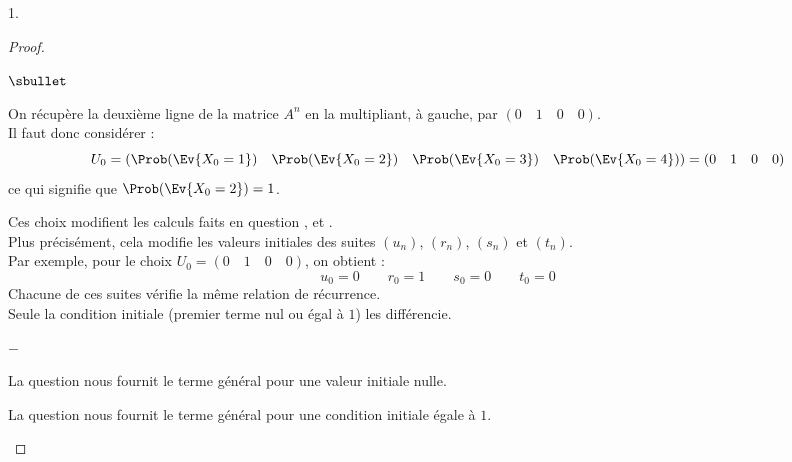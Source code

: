 \documentclass[11pt]{article}%
\begin{document}
\begin{noliste}{1.}
  \begin{proof}~%
    \begin{noliste}{$\sbullet$}
    \item On récupère la deuxième ligne de la matrice $A^n$ en la
      multipliant, à gauche, par $(0 \quad 1 \quad 0 \quad 0)$.\\
      Il faut donc considérer : 
      \[
      U_0 = (\Prob(\Ev{X_0 = 1}) \quad \Prob(\Ev{X_0 = 2}) \quad
      \Prob(\Ev{X_0 = 3}) \quad \Prob(\Ev{X_0 = 4})) = (0 \quad 1
      \quad 0 \quad 0)
      \]
      ce qui signifie que $\Prob(\Ev{X_0 = 2}) = 1$.%
    \item Ces choix modifient les calculs faits en question
      ,  et .\\
      Plus précisément, cela modifie les valeurs initiales des suites
      $(u_n)$, $(r_n)$, $(s_n)$ et $(t_n)$.\\
      Par exemple, pour le choix $U_0 = (0 \quad 1 \quad 0 \quad 0)$,
      on obtient :
      \[
      u_0 = 0 \qquad r_0 = 1 \qquad s_0 = 0 \qquad t_0 = 0
      \]
      Chacune de ces suites vérifie la même relation de
      récurrence.\\
      Seule la condition initiale (premier terme nul ou égal à $1$)
      les différencie.
      \begin{noliste}{$-$}
      \item La question  nous fournit le terme général pour
        une valeur initiale nulle.
      \item La question  nous fournit le terme général pour
        une condition initiale égale à $1$.
      \end{noliste}
\end{noliste}
\end{proof}
\end{noliste}
\end{document}
